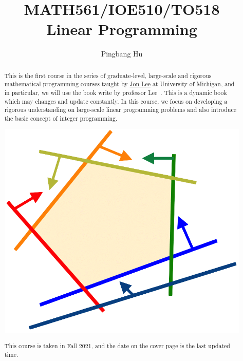 \documentclass[a4paper]{report}
\author{Pingbang Hu}
\title{MATH561/IOE510/TO518\\Linear Programming}
\begin{document}
\maketitle

\begin{abstract}
	This is the first course in the series of graduate-level, large-scale and rigorous mathematical programming courses taught by \href{https://sites.google.com/site/jonleewebpage/}{Jon Lee} at University of Michigan, and in particular, we will use the book write by professor Lee~\cite{Linear-Opt}. This is a dynamic book which may changes and update constantly. In this course, we focus on developing a rigorous understanding on large-scale linear programming problems and also introduce the basic concept of integer programming.

	\vfill
	\begin{center}
		\includegraphics[width=.8\linewidth]{Figures/cover.png}
	\end{center}
	\vfill
	This course is taken in Fall 2021, and the date on the cover page is the last updated time.
\end{abstract}

\tableofcontents

\newpage


\newpage
\printbibliography{}
\end{document}
